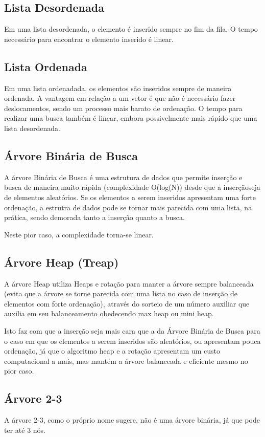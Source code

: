 \documentclass[a4paper]{article}
\begin{document}
\subsection{Lista Desordenada}
Em uma lista desordenada, o elemento é inserido sempre no fim da fila.
O tempo necessário para encontrar o elemento inserido é linear.

\subsection{Lista Ordenada}
Em uma lista ordenadada, os elementos são inseridos sempre de maneira ordenada. A vantagem em relação a um vetor é que não é necessário fazer deslocamentos, sendo um processo mais barato de ordenação.
O tempo para realizar uma busca também é linear, embora possivelmente mais rápido que uma lista desordenada.

\subsection{Árvore Binária de Busca}
A árvore Binária de Busca é uma estrutura de dados que permite inserção e busca de maneira muito rápida (complexidade O(log(N)) desde que a inserçãoseja de elementos aleatórios. Se os elementos a serem inseridos apresentam uma forte ordenação, a estrutra de dados pode se tornar mais parecida com uma lista, na prática, sendo demorada tanto a inserção quanto a busca.

Neste pior caso, a complexidade torna-se linear.

\subsection{Árvore Heap (Treap)}
A árvore Heap utiliza Heaps e rotação para manter a árvore sempre balanceada (evita que a árvore se torne parecida com uma lista no caso de inserção de elementos com forte ordenação), através do sorteio de um número auxiliar que auxilia em seu balanceamento obedecendo max heap ou mini heap.

Isto faz com que a inserção seja mais cara que a da Árvore Binária de Busca para o caso em que os elementos a serem inseridos são aleatórios, ou apresentam pouca ordenação, já que o algoritmo heap e a rotação apresentam um custo computacional a mais, mas mantém a árvore balanceada e eficiente mesmo no pior caso.

\subsection{Árvore 2-3}
A árvore 2-3, como o próprio nome sugere, não é uma árvore binária, já que pode ter até 3 nós.
\end{document}
